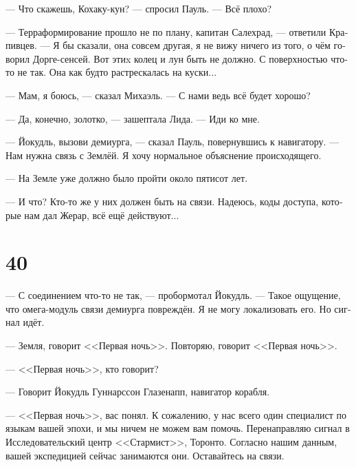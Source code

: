 \documentclass[a4paper,12pt,fleqn]{book}\usepackage{polyglossia}\setdefaultlanguage[babelshorthands=true]{russian}\setotherlanguage{english}\defaultfontfeatures{Ligatures=TeX,Mapping=tex-text}\usepackage{xcolor}\newcommand{\ml}[3]{#2}
\newcommand{\asterism}{\vspace{1em}{\centering\Large\bfseries$\ast~\ast~\ast$\par}\vspace{1em}}
\begin{document}
\ml{$0$}
{--- Что скажешь, Кохаку-кун? --- спросил Пауль.}
{``What do you think, Kohaku-kun?'' Paul asked.}
\ml{$0$}
{--- Всё плохо?}
{``How bad is it?''}

\ml{$0$}
{--- Терраформирование прошло не по плану, капитан Салехрад, --- ответили Крапивцев.}
{``Terraformation went sideways, Captain Salechrad,'' Krapiwtzew answered.}
\ml{$0$}
{--- Я бы сказали, она совсем другая, я не вижу ничего из того, о чём говорил Дорге-сенсей.}
{``I would say, it's completely different, I see nothing of what Dorgue-sensei had told about.}
\ml{$0$}
{Вот этиx колец и лун быть не должно.}
{Those rings and loonas aren't supposed to be.}
\ml{$0$}
{С поверхностью что-то не так.}
{Something's wrong about the surface.}
\ml{$0$}
{Она как будто растрескалась на куски...}
{It looks like cracked apart ...''}

--- Мам, я боюсь, --- сказал Михаэль.
--- С нами ведь всё будет хорошо?

--- Да, конечно, золотко, --- зашептала Лида.
--- Иди ко мне.

--- Йокудль, вызови демиурга, --- сказал Пауль, повернувшись к навигатору.
--- Нам нужна связь с Землёй.
Я хочу нормальное объяснение происходящего.

--- На Земле уже должно было пройти около пятисот лет.

--- И что?
Кто-то же у них должен быть на связи.
Надеюсь, коды доступа, которые нам дал Жерар, всё ещё действуют...

\section{40}

--- С соединением что-то не так, --- пробормотал Йокудль.
--- Такое ощущение, что омега-модуль связи демиурга повреждён.
Я не могу локализовать его.
Но сигнал идёт.

\asterism

--- Земля, говорит <<Первая ночь>>.
Повторяю, говорит <<Первая ночь>>.

--- <<Первая ночь>>, кто говорит?

--- Говорит Йокудль Гуннарссон Глазенапп, навигатор корабля.

--- <<Первая ночь>>, вас понял.
К сожалению, у нас всего один специалист по языкам вашей эпохи, и мы ничем не можем вам помочь.
Перенаправляю сигнал в Исследовательский центр <<Стармист>>, Торонто.
Согласно нашим данным, вашей экспедицией сейчас занимаются они.
Оставайтесь на связи.
\end{document}
